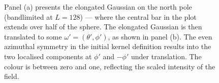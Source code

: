 \begin{figure}[htpb]
	\centering\capstart{}
	\hfill
	\caption[
		An elongated Gaussian on the north pole and then translated
	]{
		Panel (a) presents the elongated Gaussian on the north pole (bandlimited at \(L=128\)) --- where the central bar in the plot extends over half of the sphere.
		The elongated Gaussian is then translated to some \(\omega'=(\theta',\phi')\), as shown in panel (b).
		The even azimuthal symmetry in the initial kernel definition results into the two localised components at \(\phi'\) and \(-\phi'\) under translation.
		The colour is between zero and one, reflecting the scaled intensity of the field.
	}\label{fig:chapter3_elongated_gaussian}
\end{figure}
